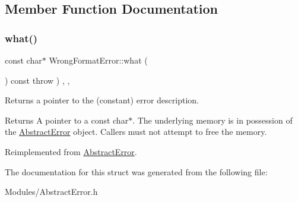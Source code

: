 \subsection{Member Function Documentation}
\mbox{\label{structWrongFormatError_a3c1c3f39ce135d19c7d0bb2fe8ddd3c1}} 
\subsubsection{\texorpdfstring{what()}{what()}}
{\footnotesize\ttfamily const char$\ast$ Wrong\+Format\+Error\+::what (\begin{DoxyParamCaption}{ }\end{DoxyParamCaption}) const throw  ) \hspace{0.3cm}{\ttfamily [inline]}, {\ttfamily [override]}, {\ttfamily [virtual]}}

Returns a pointer to the (constant) error description. \begin{DoxyReturn}{Returns}
A pointer to a const char$\ast$. The underlying memory is in possession of the \hyperlink{classAbstractError}{Abstract\+Error} object. Callers must not attempt to free the memory. 
\end{DoxyReturn}


Reimplemented from \hyperlink{classAbstractError_a19735c7a9b5f6e84db606292967667a9}{Abstract\+Error}.



The documentation for this struct was generated from the following file\+:\begin{DoxyCompactItemize}
\item 
Modules/Abstract\+Error.\+h\end{DoxyCompactItemize}
